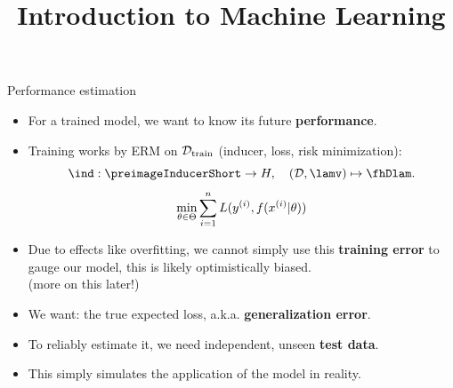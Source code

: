 





\newcommand{\titlefigure}{figure_man/eval_fig_title_intro}
\newcommand{\learninggoals}{
\item Understand the goal of performance estimation
\item Know the formal definition of generalization error as a statistical estimator of
future performance
\item Understand the difference between GE for a model and GE for a learner.
\item Understand the difference between outer and inner loss
}
\title{Introduction to Machine Learning}
\date{}



\sloppy


\begin{vbframe}{Performance estimation}

\begin{itemize}
  \item For a trained model, we want to know its future \textbf{performance}.
  \item Training works by ERM on $\mathcal{D}_{\text{train}}$ (inducer, loss, risk minimization):
  $$\ind: \preimageInducerShort \rightarrow \Hspace, \quad (\D, \lamv)
  \mapsto \fhDlam.$$
  $$ \min_{\theta \in \Theta} \sum_{i=1}^n L(y^{(i)}, f(x^{(i)} | \theta)) $$ 
  \item Due to effects like overfitting, we cannot simply use this \textbf{training error}
      to gauge our model, this is likely optimistically biased.\\ 
      (more on this later!)
  \item We want: the true expected loss, a.k.a. \textbf{generalization error}.
  \item To reliably estimate it, we need independent, unseen \textbf{test data}. 
  \item This simply simulates the application of the model in reality.    
\end{itemize}
\end{vbframe}

